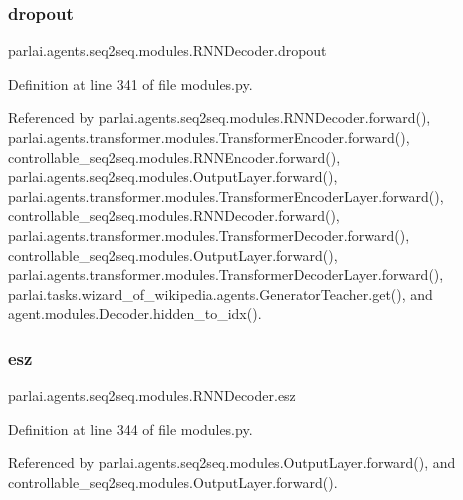 \subsubsection{\texorpdfstring{dropout}{dropout}}
{\footnotesize\ttfamily parlai.\+agents.\+seq2seq.\+modules.\+R\+N\+N\+Decoder.\+dropout}



Definition at line 341 of file modules.\+py.



Referenced by parlai.\+agents.\+seq2seq.\+modules.\+R\+N\+N\+Decoder.\+forward(), parlai.\+agents.\+transformer.\+modules.\+Transformer\+Encoder.\+forward(), controllable\+\_\+seq2seq.\+modules.\+R\+N\+N\+Encoder.\+forward(), parlai.\+agents.\+seq2seq.\+modules.\+Output\+Layer.\+forward(), parlai.\+agents.\+transformer.\+modules.\+Transformer\+Encoder\+Layer.\+forward(), controllable\+\_\+seq2seq.\+modules.\+R\+N\+N\+Decoder.\+forward(), parlai.\+agents.\+transformer.\+modules.\+Transformer\+Decoder.\+forward(), controllable\+\_\+seq2seq.\+modules.\+Output\+Layer.\+forward(), parlai.\+agents.\+transformer.\+modules.\+Transformer\+Decoder\+Layer.\+forward(), parlai.\+tasks.\+wizard\+\_\+of\+\_\+wikipedia.\+agents.\+Generator\+Teacher.\+get(), and agent.\+modules.\+Decoder.\+hidden\+\_\+to\+\_\+idx().

\mbox{\label{classparlai_1_1agents_1_1seq2seq_1_1modules_1_1RNNDecoder_aa23f87293a0dc476dd4a2c101c3796b2}} 
\subsubsection{\texorpdfstring{esz}{esz}}
{\footnotesize\ttfamily parlai.\+agents.\+seq2seq.\+modules.\+R\+N\+N\+Decoder.\+esz}



Definition at line 344 of file modules.\+py.



Referenced by parlai.\+agents.\+seq2seq.\+modules.\+Output\+Layer.\+forward(), and controllable\+\_\+seq2seq.\+modules.\+Output\+Layer.\+forward().

\mbox{\label{classparlai_1_1agents_1_1seq2seq_1_1modules_1_1RNNDecoder_ab4a5f0dcf148831333b89f3f4b2d6045}} 
